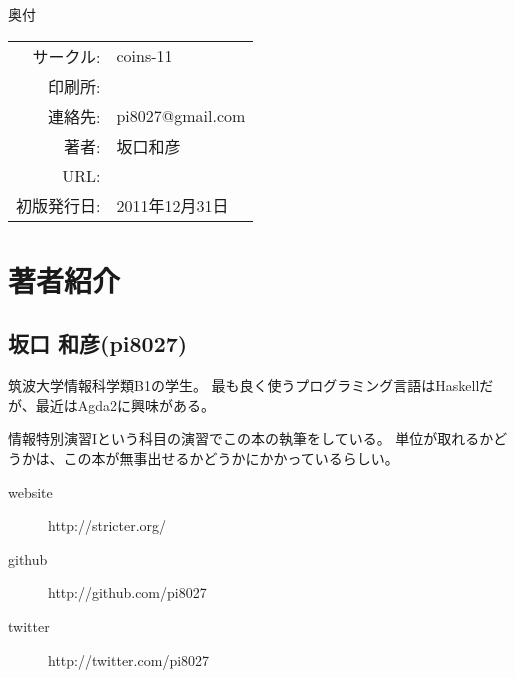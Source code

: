 \pagestyle{empty}
\begin{itembox}[1]{奥付}
\begin{tabular}{rl}
サークル:   & coins-11 \\
印刷所:     & \\
連絡先:     & pi8027@gmail.com \\
著者:       & 坂口和彦 \\
URL:        &  \\
初版発行日: & 2011年12月31日 \\
\end{tabular}
\end{itembox}

\section*{著者紹介}

\subsection*{坂口 和彦(pi8027)}

筑波大学情報科学類B1の学生。
最も良く使うプログラミング言語はHaskellだが、最近はAgda2に興味がある。

情報特別演習Iという科目の演習でこの本の執筆をしている。
単位が取れるかどうかは、この本が無事出せるかどうかにかかっているらしい。

\begin{description}
\item[website] http://stricter.org/
\item[github] http://github.com/pi8027
\item[twitter] http://twitter.com/pi8027
\end{description}

